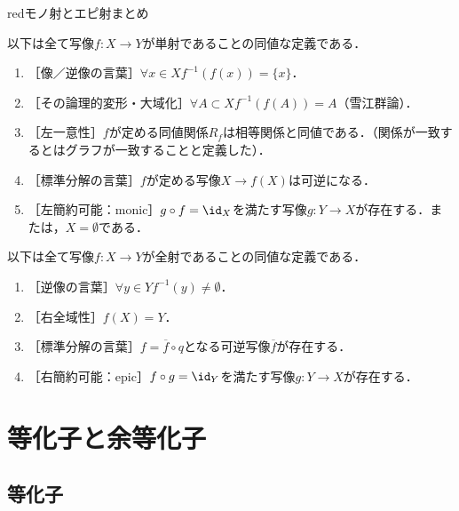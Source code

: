 \documentclass[uplatex,dvipdfmx]{jsreport}
\begin{document}
\begin{tbox}{red}{モノ射とエピ射まとめ}
    \begin{theorem}[mono]\label{thm-mono}
        以下は全て写像$f:X\to Y$が単射であることの同値な定義である．
        \begin{enumerate}
            \item ［像／逆像の言葉］$\forall x\in X f^{-1}(f(x))=\{x\}$．
            \item ［その論理的変形・大域化］$\forall A\subset X f^{-1}(f(A))=A$（雪江群論）．
            \item ［左一意性］$f$が定める同値関係$R_f$は相等関係と同値である．（関係が一致するとはグラフが一致することと定義した）．
            \item ［標準分解の言葉］$f$が定める写像$X\to f(X)$は可逆になる．
            \item ［左簡約可能：monic］$g\circ f=\id_X$を満たす写像$g:Y\to X$が存在する．または，$X=\emptyset$である．
        \end{enumerate}
    \end{theorem}
    \begin{theorem}[epi]\label{thm-epi}
        以下は全て写像$f:X\to Y$が全射であることの同値な定義である．
        \begin{enumerate}
            \item ［逆像の言葉］$\forall y\in Y f^{-1}(y)\ne\emptyset$．
            \item ［右全域性］$f(X)=Y$．
            \item ［標準分解の言葉］$f=\overline{f}\circ q$となる可逆写像$\overline{f}$が存在する．
            \item ［右簡約可能：epic］$f\circ g=\id_Y$を満たす写像$g:Y\to X$が存在する．
        \end{enumerate}
    \end{theorem}
\end{tbox}

\section{等化子と余等化子}

\subsection{等化子}
\end{document}
